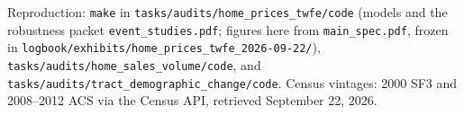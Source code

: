 \small
Reproduction: \texttt{make} in \texttt{tasks/audits/home\_prices\_twfe/code}
(models and the robustness packet \texttt{event\_studies.pdf}; figures here from
\texttt{main\_spec.pdf}, frozen in \texttt{logbook/exhibits/home\_prices\_twfe\_2026-09-22/}),
\texttt{tasks/audits/home\_sales\_volume/code}, and
\texttt{tasks/audits/tract\_demographic\_change/code}. Census vintages: 2000 SF3
and 2008--2012 ACS via the Census API, retrieved September 22, 2026.
\normalsize

